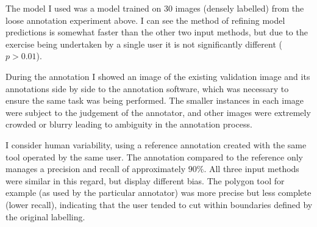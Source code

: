 The model I used was a model trained on 30 images (densely labelled) from the loose annotation experiment above. I can see the method of refining model predictions is somewhat faster than the other two input methods, but due to the exercise being undertaken by a single user it is not significantly different ($ p > 0.01 $).

During the annotation I showed an image of the existing validation image and its annotations side by side to the annotation software, which was necessary to ensure the same task was being performed. The smaller instances in each image were subject to the judgement of the annotator, and other images were extremely crowded or blurry leading to ambiguity in the annotation process. 

I consider human variability, using a reference annotation created with the same tool operated by the same user. The annotation compared to the reference only manages a precision and recall of approximately $90\%$. All three input methods were similar in this regard, but display different bias. The polygon tool for example (as used by the particular annotator) was more precise but less complete (lower recall), indicating that the user tended to cut within boundaries defined by the original labelling. 
 
\begin{table*}[!ht]
  \centering
    \caption{Statistics from annotating the validation set in different ways. Precision, recall and IOU are a comparison with the original validation set. Note figures in brackets are the original statistics of the unmodified predictions from the model}

\noindent{}

\label{tab:annotation_exp}
\end{table*}


